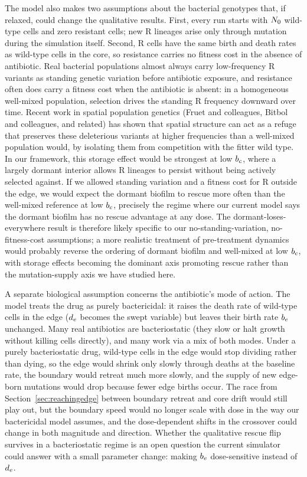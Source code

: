 The model also makes two assumptions about the bacterial genotypes that, if relaxed, could change the qualitative results. First, every run starts with $N_0$ wild-type cells and zero resistant cells; new R lineages arise only through mutation during the simulation itself. Second, R cells have the same birth and death rates as wild-type cells in the core, so resistance carries no fitness cost in the absence of antibiotic. Real bacterial populations almost always carry low-frequency R variants as standing genetic variation before antibiotic exposure, and resistance often does carry a fitness cost when the antibiotic is absent: in a homogeneous well-mixed population, selection drives the standing R frequency downward over time. Recent work in spatial population genetics (Fruet and colleagues, Bitbol and colleagues, and related) has shown that spatial structure can act as a refuge that preserves these deleterious variants at higher frequencies than a well-mixed population would, by isolating them from competition with the fitter wild type. In our framework, this storage effect would be strongest at low $b_c$, where a largely dormant interior allows R lineages to persist without being actively selected against. If we allowed standing variation and a fitness cost for R outside the edge, we would expect the dormant biofilm to rescue more often than the well-mixed reference at low $b_c$, precisely the regime where our current model says the dormant biofilm has no rescue advantage at any dose. The dormant-loses-everywhere result is therefore likely specific to our no-standing-variation, no-fitness-cost assumptions; a more realistic treatment of pre-treatment dynamics would probably reverse the ordering of dormant biofilm and well-mixed at low $b_c$, with storage effects becoming the dominant axis promoting rescue rather than the mutation-supply axis we have studied here.

A separate biological assumption concerns the antibiotic's mode of action. The model treats the drug as purely bactericidal: it raises the death rate of wild-type cells in the edge ($d_e$ becomes the swept variable) but leaves their birth rate $b_e$ unchanged. Many real antibiotics are bacteriostatic (they slow or halt growth without killing cells directly), and many work via a mix of both modes. Under a purely bacteriostatic drug, wild-type cells in the edge would stop dividing rather than dying, so the edge would shrink only slowly through deaths at the baseline rate, the boundary would retreat much more slowly, and the supply of new edge-born mutations would drop because fewer edge births occur. The race from Section~\ref{sec:reachingedge} between boundary retreat and core drift would still play out, but the boundary speed would no longer scale with dose in the way our bactericidal model assumes, and the dose-dependent shifts in the crossover could change in both magnitude and direction. Whether the qualitative rescue flip survives in a bacteriostatic regime is an open question the current simulator could answer with a small parameter change: making $b_e$ dose-sensitive instead of $d_e$.

